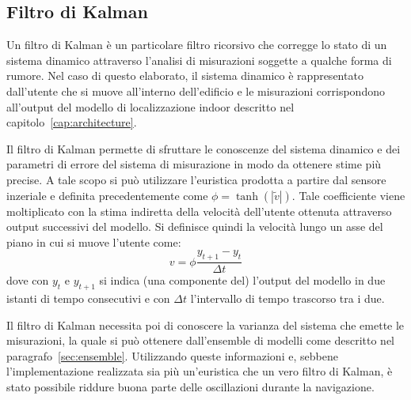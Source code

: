 \subsection{Filtro di Kalman}\label{sec:kalman}
Un filtro di Kalman è un particolare filtro ricorsivo che corregge lo stato di
un sistema dinamico attraverso l'analisi di misurazioni soggette a qualche
forma di rumore. Nel caso di questo elaborato, il sistema dinamico è
rappresentato dall'utente che si muove all'interno dell'edificio e le
misurazioni corrispondono all'output del modello di localizzazione indoor
descritto nel capitolo~\ref{cap:architecture}.

Il filtro di Kalman permette di sfruttare le conoscenze del sistema dinamico e
dei parametri di errore del sistema di misurazione in modo da ottenere stime
più precise. A tale scopo si può utilizzare l'euristica prodotta a partire dal
sensore inzeriale e definita precedentemente come \(\phi = \tanh(|\tilde{v}|)\).
Tale coefficiente viene moltiplicato con la stima indiretta della velocità
dell'utente ottenuta attraverso output successivi del modello. Si definisce
quindi la velocità lungo un asse del piano in cui si muove l'utente come:
\[ v = \phi \frac{y_{t+1} - y_t}{\Delta t} \]
dove con \(y_t\) e \(y_{t+1}\) si indica (una componente del) l'output del
modello in due istanti di tempo consecutivi e con \(\Delta t\) l'intervallo di
tempo trascorso tra i due.

Il filtro di Kalman necessita poi di conoscere la varianza del sistema che
emette le misurazioni, la quale si può ottenere dall'ensemble di modelli come
descritto nel paragrafo~\ref{sec:ensemble}. Utilizzando queste informazioni e,
sebbene l'implementazione realizzata sia più un'euristica che un vero filtro di
Kalman, è stato possibile riddure buona parte delle oscillazioni durante la
navigazione.



